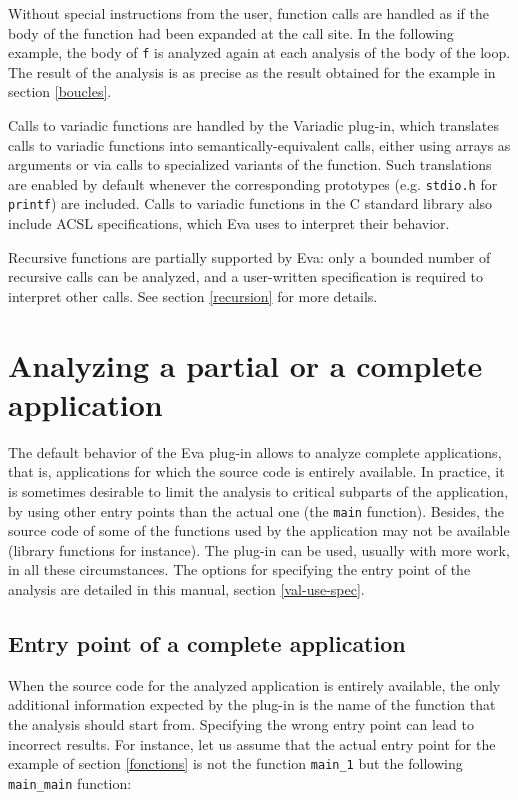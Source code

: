 \documentclass[web]{frama-c-book}
\newcommand{\Eva}{\textsf{Eva}}
\begin{document}
Without special instructions from the user, function calls are
handled as if the body of the function had been expanded at the
call site. In the following example, the body of \lstinline|f| is analyzed again
at each analysis of the body of the loop. The result of the analysis
is as precise as the result obtained for the example in section \ref{boucles}.


Calls to variadic functions are handled by the \textsf{Variadic} plug-in, which
translates calls to variadic functions into semantically-equivalent calls,
either using arrays as arguments or via calls to specialized variants of the
function. Such translations are enabled by default whenever the corresponding
prototypes (e.g. \lstinline|stdio.h| for \lstinline|printf|) are included.
Calls to variadic functions in the C standard library also include
ACSL specifications, which \Eva{} uses to interpret their behavior.

Recursive functions are partially supported by \Eva{}: only a bounded
number of recursive calls can be analyzed, and a user-written specification
is required to interpret other calls.
See section \ref{recursion} for more details.

\section{Analyzing a partial or a complete application}

The default behavior of the \Eva{} plug-in allows to
analyze complete applications,
that is, applications for which the source code is entirely
available. In practice, it is sometimes desirable to limit the analysis
to critical subparts of the application, by using other entry points
than the actual one (the \lstinline|main| function).
Besides, the source code of some of the functions used by
the application may not be available (library functions for instance).
The plug-in can be used, usually with more work, in all these circumstances.
The options for specifying the entry point of the analysis are detailed
in this manual, section \ref{val-use-spec}.

\subsection{Entry point of a complete application}

When the source code for the analyzed application is entirely
available, the only additional information expected by the plug-in is
the name of the function that the analysis should start from. Specifying the
wrong entry point can lead to incorrect results. For instance, let us
assume that the actual entry point for the example of section
\ref{fonctions} is not the function \lstinline|main_1| but the following
\lstinline|main_main| function:
\end{document}

